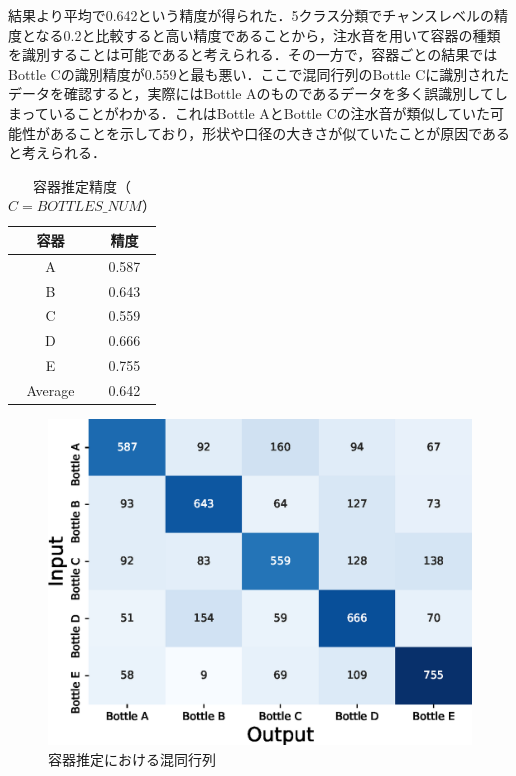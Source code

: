 \documentclass[submit,techrep,noauthor]{ipsj}
\begin{document}
結果より平均で0.642という精度が得られた．5クラス分類でチャンスレベルの精度となる0.2と比較すると高い精度であることから，注水音を用いて容器の種類を識別することは可能であると考えられる．その一方で，容器ごとの結果ではBottle Cの識別精度が0.559と最も悪い．ここで混同行列のBottle Cに識別されたデータを確認すると，実際にはBottle Aのものであるデータを多く誤識別してしまっていることがわかる．これはBottle AとBottle Cの注水音が類似していた可能性があることを示しており，形状や口径の大きさが似ていたことが原因であると考えられる．

\begin{table}[!t]
  \small
  \centering
  \caption{容器推定精度（$C=BOTTLES\_NUM$）}
  \begin{tabular}{c|c} \hline\hline
    容器 & 精度 \\ \hline
    A & 0.587 \\
    B & 0.643 \\
    C & 0.559 \\
    D & 0.666 \\
    E & 0.755 \\ \hline
    Average & 0.642 \\ \hline
  \end{tabular}
  \label{tab:result_5}
\end{table}

\begin{figure}[!t]
  \centering
  \includegraphics[width=1\linewidth]{figures/confusion_matrix_5.eps}
  \caption{容器推定における混同行列}
  \label{fig:confusion_matrix_5}
\end{figure}
\end{document}
